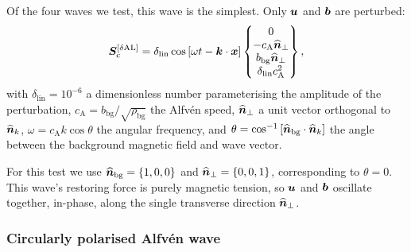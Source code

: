 Of the four waves we test, this wave is the simplest. Only $\bm{u}$ and $\bm{b}$ are perturbed:
\begin{align}
    \bm{S}_\mathrm{c}^{[\delta\mathrm{AL}]}
        = \delta_\mathrm{lin} \cos\left[ 
                \omega t - \bm{k}\cdot\bm{x}
             \right]
        \begin{Bmatrix}
            0 \\
            -c_\mathrm{A} \widehat{\bm{n}}_\perp \\
            b_\mathrm{bg} \widehat{\bm{n}}_\perp \\
            \delta_\mathrm{lin} c_\mathrm{A}^2
        \end{Bmatrix}
    ,
\end{align}
with $\delta_\mathrm{lin} = 10^{-6}$ a dimensionless number parameterising the amplitude of the perturbation, $c_\mathrm{A} = b_\mathrm{bg} / \sqrt{\rho_\mathrm{bg}}$ the Alfv\'en speed, $\widehat{\bm{n}}_\perp$ a unit vector orthogonal to $\widehat{\bm{n}}_{k}$, $\omega = c_\mathrm{A} k \cos\theta$ the angular frequency, and $\theta = \cos^{-1}\left[ \widehat{\bm{n}}_\mathrm{bg} \cdot \widehat{\bm{n}}_{k} \right]$ the angle between the background magnetic field and wave vector.

For this test we use $\widehat{\bm{n}}_\mathrm{bg} = \{1,0,0\}$ and $\widehat{\bm{n}}_\perp = \{0,0,1\}$, corresponding to $\theta = 0$. This wave's restoring force is purely magnetic tension, so $\bm{u}$ and $\bm{b}$ oscillate together, in-phase, along the single transverse direction $\widehat{\bm{n}}_\perp$.

\subsubsection{Circularly polarised Alfv\'en wave}
\label{sec:scheme-comparison:waves:alfven-circular}

